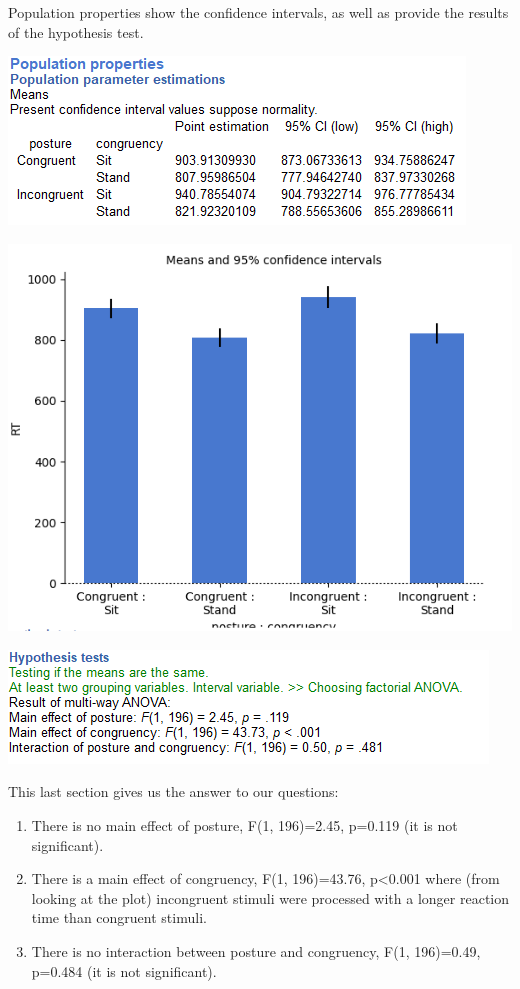 \documentclass[
]{book}
\begin{document}
Population properties show the confidence intervals, as well as provide the results of the hypothesis test.

\includegraphics{img/ch10/10.3comparegroups_popprop.png}

\includegraphics{img/ch10/10.3comparegroups_CI.png}

\includegraphics{img/ch10/10.3comparegroups_hyptest.png}

This last section gives us the answer to our questions:

\begin{enumerate}
\def\labelenumi{\arabic{enumi}.}
\item
  There is no main effect of posture, F(1, 196)=2.45, p=0.119 (it is not significant).
\item
  There is a main effect of congruency, F(1, 196)=43.76, p\textless0.001 where (from looking at the plot) incongruent stimuli were processed with a longer reaction time than congruent stimuli.
\item
  There is no interaction between posture and congruency, F(1, 196)=0.49, p=0.484 (it is not significant).
\end{enumerate}
\end{document}
